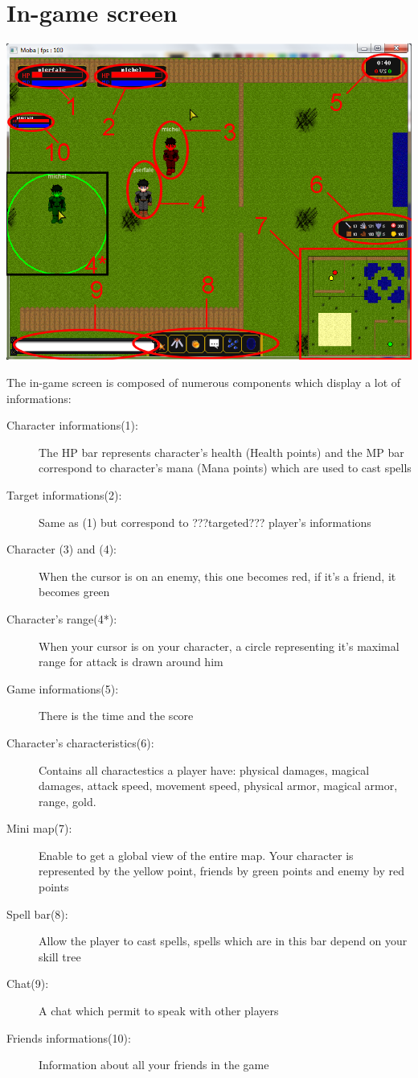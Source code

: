 \documentclass{scrreprt}
\begin{document}
			  \section{In-game screen}
			  \begin{center}
			  \includegraphics[scale=0.4]{in_game.png}
			  \end{center}
			  The in-game screen is composed of numerous components which display a lot of informations:
			  \begin{description}
			  \item[Character informations(1):]{The HP bar represents character's health (Health points) and the MP bar correspond to character's mana (Mana points) which are used to cast spells}
			  \item[Target informations(2):]{Same as (1) but correspond to ???targeted??? player's informations}
			  \item[Character (3) and (4):]{When the cursor is on an enemy, this one becomes red, if it's a friend, it becomes green}
			  \item[Character's range(4*):]{When your cursor is on your character, a circle representing it's maximal range for attack is drawn around him}
			  \item[Game informations(5):]{There is the time and the score}
			  \item[Character's characteristics(6):]{Contains all charactestics a player have: physical damages, magical damages, attack speed, movement speed, physical armor, magical armor, range, gold.}
			  \item[Mini map(7):]{Enable to get a global view of the entire map. Your character is represented by the yellow point, friends by green points and enemy by red points}
			  \item[Spell bar(8):]{Allow the player to cast spells, spells which are in this bar depend on your skill tree}
			  \item[Chat(9):]{A chat which permit to speak with other players}
			  \item[Friends informations(10):]{Information about all your friends in the game}
			  \end{description}
\end{document}
